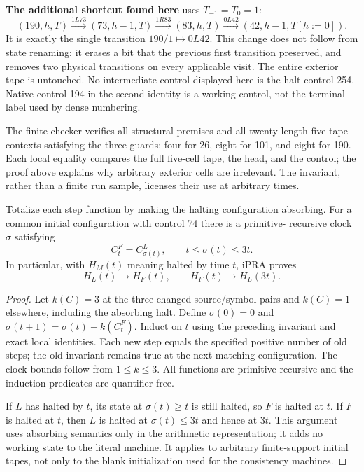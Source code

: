 \textbf{The additional shortcut found here} uses $T_{-1}=T_0=1$:
\[
(190,h,T)\xrightarrow{1L73}(73,h-1,T)
 \xrightarrow{1R83}(83,h,T)\xrightarrow{0L42}(42,h-1,T[h:=0]).
\]
It is exactly the single transition $190/1\mapsto0L42$. This change does
not follow from state renaming: it erases a bit that the previous first
transition preserved, and removes two physical transitions on every
applicable visit. The entire exterior tape is untouched. No intermediate
control displayed here is the halt control 254. Native control 194 in the
second identity is a working control, not the terminal label used by dense
numbering.

The finite checker verifies all structural premises and all twenty
length-five tape contexts satisfying the three guards: four for 26,
eight for 101, and eight for 190. Each local equality compares the full
five-cell tape, the head, and the control; the proof above explains why
arbitrary exterior cells are irrelevant. The invariant, rather than a
finite run sample, licenses their use at arbitrary times.

\begin{theorem}
Totalize each step function by making the halting configuration absorbing.
For a common initial configuration with control 74 there is a primitive-
recursive clock $\sigma$ satisfying
\[
C^F_t=C^L_{\sigma(t)},\qquad t\le\sigma(t)\le3t.
\]
In particular, with $H_M(t)$ meaning halted by time $t$, iPRA proves
\[
H_L(t)\longrightarrow H_F(t),\qquad
H_F(t)\longrightarrow H_L(3t).
\]
\end{theorem}
\begin{proof}
Let $k(C)=3$ at the three changed source/symbol pairs and $k(C)=1$
elsewhere, including the absorbing halt. Define
$\sigma(0)=0$ and $\sigma(t+1)=\sigma(t)+k(C^F_t)$.
Induct on $t$ using the preceding invariant and exact local identities.
Each new step equals the specified positive number of old steps; the old
invariant remains true at the next matching configuration. The clock bounds
follow from $1\le k\le3$. All functions are primitive recursive and the
induction predicates are quantifier free.

If $L$ has halted by $t$, its state at $\sigma(t)\ge t$ is still halted,
so $F$ is halted at $t$. If $F$ is halted at $t$, then $L$ is halted at
$\sigma(t)\le3t$ and hence at $3t$. This argument uses absorbing semantics
only in the arithmetic representation; it adds no working state to the
literal machine. It applies to arbitrary finite-support initial tapes,
not only to the blank initialization used for the consistency machines.
\end{proof}

